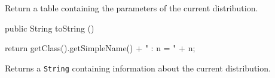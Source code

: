 \begin{tabb}
   Return a table containing the parameters of the current distribution.
\end{tabb}
\begin{hide}\begin{code}

   public String toString ()\begin{hide} {
      return getClass().getSimpleName() + " : n = " + n;
   }\end{hide}
\end{code}
\begin{tabb}
   Returns a \texttt{String} containing information about the current distribution.
\end{tabb}\end{hide}
\begin{code}\begin{hide}
}\end{hide}
\end{code}
